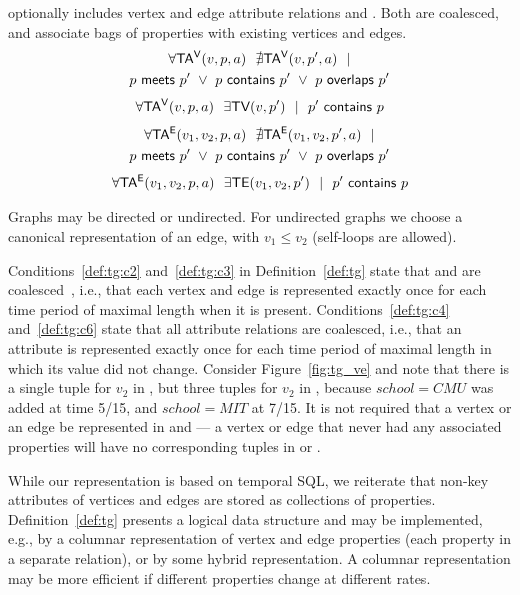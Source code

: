 \begin{definition}
\tve optionally includes vertex and edge attribute relations \tav
and \tae.  Both are coalesced, and associate bags of properties with
existing vertices and edges.
\vspace{-0.3cm}
\begin{multline}
\forall \mathsf{TA^{V}}(v, p, a)~~\nexists \mathsf{TA^{V}}(v, p', a)~~| \\
                       p~\mathsf{meets}~p'~\lor~p~\mathsf{contains}~p'~\lor~p~\mathsf{overlaps}~p'
\label{def:tg:c4}
\end{multline}
\vspace{-0.5cm}
\begin{multline}
\forall \mathsf{TA^{V}}(v, p, a)~~\exists \textsf{TV}(v,p')~~|~~p'~\mathsf{contains}~p
\label{def:tg:c5}
\end{multline}
\vspace{-0.5cm}
\begin{multline}
\forall \mathsf{TA^{E}}(v_1, v_2, p, a)~~\nexists \mathsf{TA^{E}}(v_1, v_2, p', a)~~| \\
                       p~\mathsf{meets}~p'~\lor~p~\mathsf{contains}~p'~\lor~p~\mathsf{overlaps}~p'
\label{def:tg:c6}
\end{multline}
\vspace{-0.5cm}
\begin{multline}
\forall \mathsf{TA^{E}}(v_1, v_2, p, a)~~\exists \textsf{TE}(v_1,v_2,p')~~|~~p'~\mathsf{contains}~p
\label{def:tg:c7}
\end{multline}
\vspace{-0.6cm}
\label{def:tg}
\end{definition}
\vspace{-0.3cm}
Graphs may be directed or undirected.  For undirected graphs we choose
a canonical representation of an edge, with $v_1 \leq v_2$ (self-loops
are allowed).

Conditions~\ref{def:tg:c2} and~\ref{def:tg:c3} in
Definition~\ref{def:tg} state that \tv and \te are
coalesced~\cite{DBLP:conf/vldb/BohlenSS96}, i.e., that each vertex and
edge is represented exactly once for each time period of maximal
length when it is present.  Conditions~\ref{def:tg:c4}
and~\ref{def:tg:c6} state that all attribute relations are coalesced,
i.e., that an attribute is represented exactly once for each time
period of maximal length in which its value did not change.  Consider
Figure~\ref{fig:tg_ve} and note that there is a single tuple for $v_2$
in \tv, but three tuples for $v_2$ in \tav, because $school=CMU$ was
added at time 5/15, and $school=MIT$ at 7/15.  It is not required that
a vertex or an edge be represented in \tav and \tae --- a vertex or
edge that never had any associated properties will have no
corresponding tuples in \tav or \tae.

While our \ve representation is based on temporal SQL, we reiterate
that non-key attributes of vertices and edges are stored as
collections of properties.  Definition~\ref{def:tg} presents a logical
data structure and may be implemented, e.g., by a columnar
representation of vertex and edge properties (each property in a
separate relation), or by some hybrid representation.  A columnar
representation may be more efficient if different properties change at
different rates.

